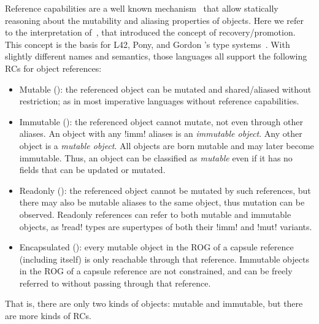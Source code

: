 Reference capabilities
 are a well known mechanism~\cite{TschantzErnst05,BirkaErnst04,OstlundEtAl08,clebsch2015deny,GianniniEtAl16,GordonEtAl12} that 
 allow statically reasoning about the mutability and aliasing properties of objects. Here we refer to the interpretation of~\cite{GordonEtAl12}, that introduced the concept of recovery/promotion. This concept is the basis for L42, Pony, and Gordon \etal's type systems~\cite{GordonEtAl12,ServettoEtAl13a,ServettoZucca15,clebsch2015deny,clebsch2017orca}. With slightly different names and semantics, those languages all support the following RCs for object references: %
\begin{itemize}

\item Mutable (\Q@mut@): the referenced object can be mutated and shared/aliased without restriction; as in most imperative languages without reference capabilities.

\item Immutable (\Q@imm@): the referenced object cannot mutate, not even through other aliases. An object with any \Q!imm! aliases is an \emph{immutable object}.
Any other object is a \emph{mutable object}.
All objects are born mutable and may later become immutable.
Thus, an object can be classified as \emph{mutable} even if it has no fields that can be updated or mutated.


\item Readonly (\Q@read@): the referenced object cannot be mutated by such references, but there may also be mutable aliases to the same object, thus mutation can be observed. Readonly references can refer to both mutable and immutable objects, as \Q!read! types are supertypes of both their \Q!imm! and \Q!mut! variants.

\item Encapsulated (\Q@capsule@):
every mutable object in the ROG of a capsule reference (including itself) is only reachable through that reference. 
Immutable objects in the ROG of a capsule reference are not constrained, and can be freely referred to without passing through that reference. 
\end{itemize}
\noindent That is, there are only two kinds of objects: mutable and immutable, but there are more kinds of RCs.

